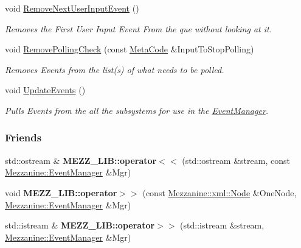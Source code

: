 \begin{DoxyCompactItemize}
void \hyperlink{classMezzanine_1_1EventManager_a1d2681b16ec802f8271f2651ff40c083}{RemoveNextUserInputEvent} ()
\begin{DoxyCompactList}\small\item\em Removes the First User Input Event From the que without looking at it. \item\end{DoxyCompactList}\item 
void \hyperlink{classMezzanine_1_1EventManager_a446cab99c7c67b42e28753cda14d79a4}{RemovePollingCheck} (const \hyperlink{classMezzanine_1_1MetaCode}{MetaCode} \&InputToStopPolling)
\begin{DoxyCompactList}\small\item\em Removes Events from the list(s) of what needs to be polled. \item\end{DoxyCompactList}\item 
void \hyperlink{classMezzanine_1_1EventManager_a07119a541a60a515e2108c79cf6e3aac}{UpdateEvents} ()
\begin{DoxyCompactList}\small\item\em Pulls Events from the all the subsystems for use in the \hyperlink{classMezzanine_1_1EventManager}{EventManager}. \item\end{DoxyCompactList}\end{DoxyCompactItemize}
\subsubsection*{Friends}
\begin{DoxyCompactItemize}
\item 
\hypertarget{classMezzanine_1_1EventManager_a3e84a2260b3cad6e78c2e569c3617835}{
std::ostream \& {\bfseries MEZZ\_\-LIB::operator$<$$<$} (std::ostream \&stream, const \hyperlink{classMezzanine_1_1EventManager}{Mezzanine::EventManager} \&Mgr)}
\label{classMezzanine_1_1EventManager_a3e84a2260b3cad6e78c2e569c3617835}

\item 
\hypertarget{classMezzanine_1_1EventManager_ad8909ab0c0d6f45635eb3c8e156ac469}{
void {\bfseries MEZZ\_\-LIB::operator$>$$>$} (const \hyperlink{classMezzanine_1_1xml_1_1Node}{Mezzanine::xml::Node} \&OneNode, \hyperlink{classMezzanine_1_1EventManager}{Mezzanine::EventManager} \&Mgr)}
\label{classMezzanine_1_1EventManager_ad8909ab0c0d6f45635eb3c8e156ac469}

\item 
\hypertarget{classMezzanine_1_1EventManager_a63dad9f5ed1ea4002e82d523b009894d}{
std::istream \& {\bfseries MEZZ\_\-LIB::operator$>$$>$} (std::istream \&stream, \hyperlink{classMezzanine_1_1EventManager}{Mezzanine::EventManager} \&Mgr)}
\label{classMezzanine_1_1EventManager_a63dad9f5ed1ea4002e82d523b009894d}

\end{DoxyCompactItemize}


